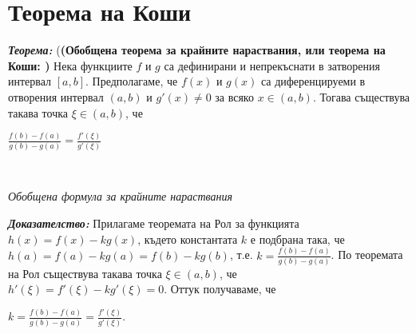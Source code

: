 \documentclass[11pt]{article} %
\newcommand{\italicBold}[1]{\textbf{\emph{#1}}}
\newcommand{\theorem}{\italicBold{Теорема: }}
\newcommand{\proof}{\italicBold{Доказателство: }}
\begin{document}
\section{Теорема на Коши}
\theorem (\textbf{(Обобщена теорема  за крайните нараствания, или теорема на Коши: )} Нека функциите $f$ и $g$ са дефинирани и непрекъснати в затворения интервал $[a,b]$. Предполагаме, че $f(x)$ и $g(x)$ са диференцируеми в отворения интервал $(a,b)$ и $g'(x) \neq 0$ за всяко $x \in (a,b)$. Тогава съществува такава точка $\xi \in (a,b)$, че \\
\centerline{$\frac{f(b)-f(a)}{g(b)-g(a)}=\frac{f'(\xi)}{g'(\xi)}$}\\
\centerline{\textit{Обобщена формула за крайните нараствания}}
\par
\proof Прилагаме теоремата на Рол за функцията $h(x)=f(x)-kg(x)$, където константата $k$ е подбрана така, че $h(a) = f(a)-kg(a)=f(b)-kg(b)$, т.е. $k = \frac{f(b)-f(a)}{g(b)-g(a)}$. По теоремата на Рол съществува такава точка $\xi \in (a,b)$, че \\$h'(\xi)=f'(\xi)-kg'(\xi)=0$. Оттук получаваме, че\\
\centerline{$k = \frac{f(b)-f(a)}{g(b)-g(a)}=\frac{f'(\xi)}{g'(\xi)}$.} 
\end{document}
